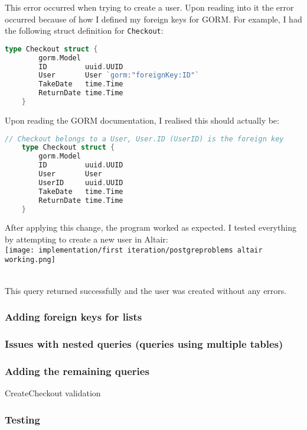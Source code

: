 \documentclass[../../main.tex]{subfiles}
\begin{document}
\noindent This error occurred when trying to create a user. Upon reading into it the error occurred because of how I defined my foreign keys for GORM. For example, I had the following struct definition for \lstinline{Checkout}:

\begin{lstlisting}[language=Go]
    type Checkout struct {
        gorm.Model
        ID         uuid.UUID
        User       User `gorm:"foreignKey:ID"`
        TakeDate   time.Time
        ReturnDate time.Time
    }
    \end{lstlisting}

\noindent Upon reading the GORM documentation, I realised this should actually be:

\begin{lstlisting}[language=Go]
    // Checkout belongs to a User, User.ID (UserID) is the foreign key
    type Checkout struct {
        gorm.Model
        ID         uuid.UUID
        User       User
        UserID     uuid.UUID
        TakeDate   time.Time
        ReturnDate time.Time
    }
    \end{lstlisting}

\noindent After applying this change, the program worked as expected. I tested everything by attempting to create a new user in Altair:\\

\texttt{[image: implementation/first iteration/postgreproblems altair working.png]}

\noindent \\ This query returned successfully and the user was created without any errors.

\subsubsection{Adding foreign keys for lists}

\subsubsection{Issues with nested queries (queries using multiple tables)}

\subsubsection{Adding the remaining queries}

CreateCheckout validation

\subsubsection{Testing}
\end{document}

